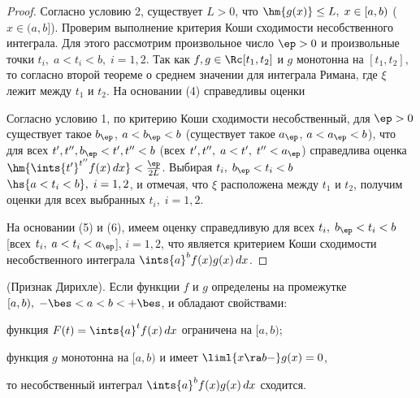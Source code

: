 \documentclass[a4paper]{article}
\begin{document}
\begin{proof}
Согласно условию 2, существует $L>0$, что $\hm{g(x)}\le L, \;
x\in[a,b)$ ($x\in(a,b]$). Проверим выполнение критерия Коши
сходимости несобственного интеграла. Для этого рассмотрим
произвольное число $\ep>0$ и произвольные точки $t_i, \; a<t_i<b, \;
i=1,2$. Так как $f,g\in\Rc[t_1,t_2]$ и $g$ монотонна на $[t_1,t_2]$,
то согласно второй теореме о среднем значении для интеграла Римана,
 где $\xi$ лежит между $t_1$
и $t_2$. На основании (4) справедливы оценки

Согласно условию 1, по критерию Коши сходимости несобственный, для
$\ep>0$ существует такое $b_{\ep}$, $a<b_{\ep}<b$ (существует такое
$a_{\ep}$, $a<a_{\ep}<b$), что для всех $t',t'', b_{\ep}<t', t''<b$
(всех $t',t'', \; a<t', \; t''<a_{\ep}$) справедлива оценка
$\hm{\ints{t'}^{t''} f(x)\,dx} < \frac{\ep}{2L}$. Выбирая $t_i, \;
b_{\ep} < t_i < b$ $\hs{a<t_i<b}, \; i=1,2$, и отмечая, что $\xi$
расположена между $t_1$ и $t_2$, получим оценки
 для всех выбранных
$t_i, \; i=1,2$.

На основании (5) и (6), имеем оценку 
справедливую для всех $t_i, \; b_{\ep}<t_i<b$ [всех $t_i, \;
a<t_i<a_{\ep}$], $i=1,2$, что является критерием Коши сходимости
несобственного интеграла $\ints{a}^b f(x)g(x)\,dx$.
\end{proof}

\begin{theorem}
(Признак Дирихле). Если функции $f$ и $g$ определены на промежутке
$[a,b), \; -\bes<a<b<+\bes$, и обладают свойствами:
\begin{nums}{-2}\item функция $F(t) = \ints{a}^t f(x)\,dx$
ограничена на $[a,b)$; \item функция $g$ монотонна на $[a,b)$ и
имеет $\liml{x\ra b-} g(x)=0$,\end{nums} то несобственный интеграл
$\ints{a}^b f(x)g(x)\,dx$ сходится.
\end{theorem}
\end{document}
